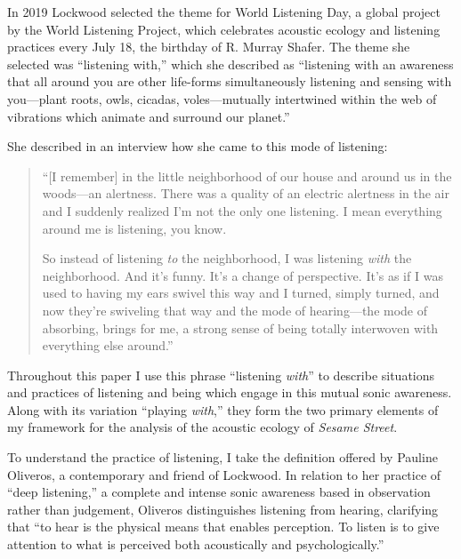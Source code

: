 \documentclass[12pt,letterpaper]{article}
\begin{document}
	In 2019 Lockwood selected the theme for World Listening Day, a global
	project by the World Listening Project, which celebrates acoustic 
	ecology and listening practices every July 18, the birthday of R. 
	Murray Shafer. The theme she selected was ``listening with,'' which she
	described as ``listening with an awareness that all around you are other
	life-forms simultaneously listening and sensing with you---plant roots,
	owls, cicadas, voles---mutually intertwined within the web of vibrations
	which animate and surround our planet.''\autocite{WLP}  

	She described in an interview how she came to this mode of listening:
	
	\begin{quote}
	\singlespacing

	``[I remember] in the little neighborhood of our house and around us 
	in the 
	woods---an alertness. There was a quality of an electric alertness in 
	the air and I suddenly realized I'm not the only one listening. I mean 
	everything around me is listening, you know.
	
	So instead of listening \textit{to} the neighborhood, I was listening 
	\textit{with} the neighborhood. And it's funny. It's a change of 
	perspective. It's as if I was used to having my ears swivel this way and
	I turned, simply turned, and now they're swiveling that way and the mode
	of hearing---the mode of absorbing, brings for me, a strong sense of 
	being totally interwoven with everything else 
	around.''\autocite{WLPVimeo} 
	
	\end{quote}
	\doublespacing

	Throughout this paper I use this phrase ``listening \textit{with}'' to
	describe situations and practices of listening and being which
	engage in this mutual sonic awareness. Along with its variation 
	``playing \textit{with},'' they form the two primary elements of my
	framework for the analysis of the acoustic ecology of 
	\textit{Sesame Street}. 

	To understand the practice of listening, I take the definition offered 
	by Pauline Oliveros, a contemporary and friend of 
	Lockwood.\autocite[116]{Rodgers} In relation to her practice of ``deep 
	listening,'' a complete and intense sonic awareness based in observation	
  rather than judgement, Oliveros distinguishes listening from hearing, 
	clarifying that ``to hear is the physical means that enables perception.
	To listen is to give attention to what is perceived both acoustically 
	and psychologically.''\autocite[33/366, As things stand today, e-books
	are basically useless for academic research because they lack, of all
	things, page numbers. At its bare-bones, a synthetic work like this
	methodology section is just a long list of page numbers, which makes 
	my reading habbits slightly unhealthy. I'm going to go back and find
	the page numbers in the hard cover edition, but for now, I will list
	them as fractions.]{Odell}  
\end{document}
